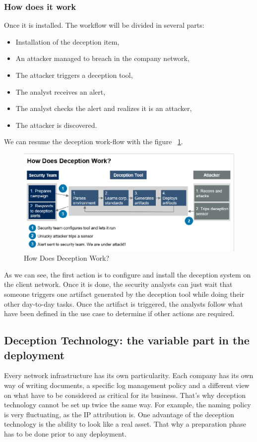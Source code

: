 \documentclass{tnreport}
\begin{document}
\subsubsection{How does it work}
Once it is installed. The workflow will be divided in several parts: 
\begin{itemize}
    \item Installation of the deception item,
    \item An attacker managed to breach in the company network,
    \item The attacker triggers a deception tool,
    \item The analyst receives an alert,
    \item The analyst checks the alert and realizes it is an attacker,
    \item The attacker is discovered.
\end{itemize}
We can resume the deception work-flow with the figure ~\ref{deception_work}.
\begin{figure}[h!]
  \begin{center}
  \includegraphics[scale=1]{figures/deception_works}
  \caption{How Does Deception Work? \cite{lib16}}
  \label{deception_work}
  \end{center}
\end{figure}

As we can see, the first action is to configure and install the deception system on the client network. Once it is done, the security analysts can just wait that someone triggers one artifact generated by the deception tool while doing their other day-to-day tasks. Once the artifact is triggered, the analysts follow what have been defined in the use case to determine if other actions are required.

\subsection{Deception Technology: the variable part in the deployment}
Every network infrastructure has its own particularity. Each company has its own way of writing documents, a specific log management policy and a different view on what have to be considered as critical for its business. That's why deception technology cannot be set up twice the same way. For example, the naming policy is very fluctuating, as the IP attribution is. One advantage of the deception technology is the ability to look like a real asset. That why a preparation phase has to be done prior to any deployment.
\end{document}
